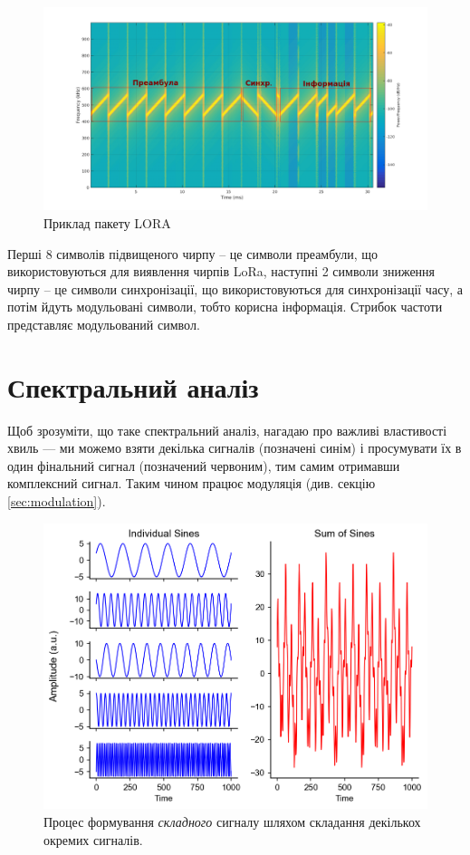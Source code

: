 \documentclass{article}
\begin{document}
\begin{figure}[h!]
	\centering
	\includegraphics[width=1\linewidth]{images/lora_preambul.png}
	\caption{\label{fig:lora_preambul} Приклад пакету LORA}
\end{figure}

Перші 8 символів підвищеного чирпу – це символи преамбули, що використовуються для виявлення чирпів LoRa, наступні 2 символи зниження чирпу – це символи синхронізації, що використовуються для синхронізації часу, а потім йдуть модульовані символи, тобто корисна інформація. Стрибок частоти представляє модульований символ.


\newpage
\section{Спектральний аналіз}

Щоб зрозуміти, що таке спектральний аналіз, нагадаю про важливі властивості хвиль --- ми можемо взяти декілька сигналів (позначені синім) і просумувати їх в один фінальний сигнал (позначений червоним), тим самим отримавши комплексний сигнал. Таким чином працює модуляція (див. секцію \ref{sec:modulation}).

\begin{figure}[h!]
\centering
\includegraphics[width=0.6\linewidth]{images/signals-sum.png}
\caption{\label{fig:signals-sum}Процес формування \textit{складного} сигналу шляхом складання декількох окремих сигналів.}
\end{figure}
\end{document}
